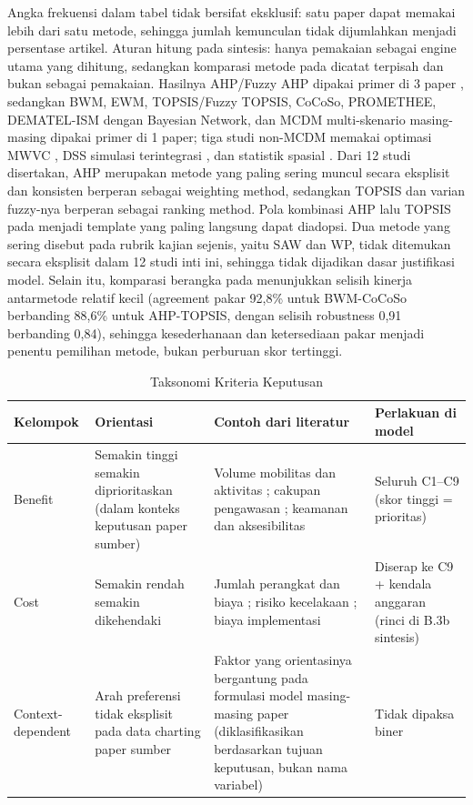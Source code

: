 \documentclass[conference]{IEEEtran}
\begin{document}
Angka frekuensi dalam tabel tidak bersifat eksklusif: satu paper dapat memakai lebih dari satu metode, sehingga jumlah kemunculan tidak dijumlahkan menjadi persentase artikel. Aturan hitung pada sintesis: hanya pemakaian sebagai engine utama yang dihitung, sedangkan komparasi metode pada \cite{baddour2026} dicatat terpisah dan bukan sebagai pemakaian. Hasilnya AHP/Fuzzy AHP dipakai primer di 3 paper \cite{ahmed2022,kanj2024,shiddiqy2025}, sedangkan BWM, EWM, TOPSIS/Fuzzy TOPSIS, CoCoSo, PROMETHEE, DEMATEL-ISM dengan Bayesian Network, dan MCDM multi-skenario masing-masing dipakai primer di 1 paper; tiga studi non-MCDM memakai optimasi MWVC \cite{wang2025}, DSS simulasi terintegrasi \cite{gonzalez2024}, dan statistik spasial \cite{feizizadeh2025}. Dari 12 studi disertakan, AHP merupakan metode yang paling sering muncul secara eksplisit dan konsisten berperan sebagai weighting method, sedangkan TOPSIS dan varian fuzzy-nya berperan sebagai ranking method. Pola kombinasi AHP lalu TOPSIS pada \cite{kanj2024} menjadi template yang paling langsung dapat diadopsi. Dua metode yang sering disebut pada rubrik kajian sejenis, yaitu SAW dan WP, tidak ditemukan secara eksplisit dalam 12 studi inti ini, sehingga tidak dijadikan dasar justifikasi model. Selain itu, komparasi berangka pada \cite{baddour2026} menunjukkan selisih kinerja antarmetode relatif kecil (agreement pakar 92,8\% untuk BWM-CoCoSo berbanding 88,6\% untuk AHP-TOPSIS, dengan selisih robustness 0,91 berbanding 0,84), sehingga kesederhanaan dan ketersediaan pakar menjadi penentu pemilihan metode, bukan perburuan skor tertinggi.

\begin{table}[!t]
\caption{Taksonomi Kriteria Keputusan}
\label{tab:taksonomi}
\centering
\begin{tabular}{p{1.2cm}p{2.0cm}p{2.4cm}p{2.0cm}}
\toprule
\textbf{Kelompok} & \textbf{Orientasi} & \textbf{Contoh dari literatur} & \textbf{Perlakuan di model} \\
\midrule
Benefit & Semakin tinggi semakin diprioritaskan (dalam konteks keputusan paper sumber) & Volume mobilitas dan aktivitas \cite{feizizadeh2025}; cakupan pengawasan \cite{wang2025,yuhang2025}; keamanan dan aksesibilitas \cite{baddour2026,almassawa2024} & Seluruh C1--C9 (skor tinggi = prioritas) \\
Cost & Semakin rendah semakin dikehendaki & Jumlah perangkat dan biaya \cite{wang2025}; risiko kecelakaan \cite{kabashkin2025}; biaya implementasi \cite{baddour2026} & Diserap ke C9 + kendala anggaran (rinci di B.3b sintesis) \\
Context-dependent & Arah preferensi tidak eksplisit pada data charting paper sumber & Faktor yang orientasinya bergantung pada formulasi model masing-masing paper (diklasifikasikan berdasarkan tujuan keputusan, bukan nama variabel) & Tidak dipaksa biner \\
\bottomrule
\end{tabular}
\end{table}
\end{document}
